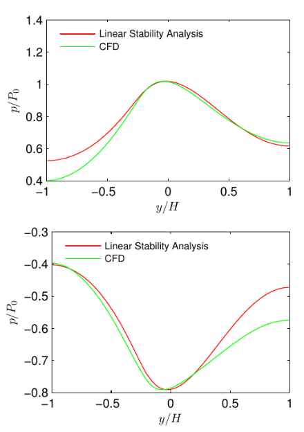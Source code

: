 \documentclass[12pt]{report}   %
\begin{document}
\begin{figure}
\centerline{\includegraphics{LinearStabilityVsCFD_Saturated_p_phase0} \includegraphics{LinearStabilityVsCFD_Saturated_p_phase90}}
\label{CFD_vs_LinearStability_u}
\end{figure}







%
\clearpage{\pagestyle{empty}\cleardoublepage}

\appendix
\end{document}
